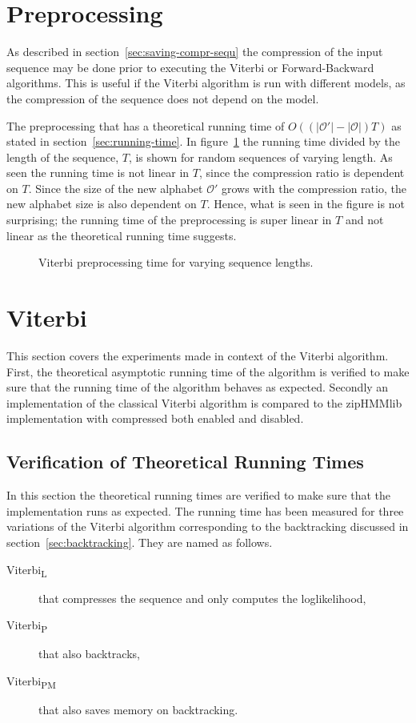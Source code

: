 \section{Preprocessing}

As described in section~\ref{sec:saving-compr-sequ} the compression of the
input sequence may be done prior to executing the Viterbi or Forward-Backward
algorithms. This is useful if the Viterbi algorithm is run with different
models, as the compression of the sequence does not depend on the model.

The preprocessing that has a theoretical running time of
$O( \left( \lvert\mathcal{O'}\rvert - \lvert{\mathcal{O}}\rvert \right) T)$ as
stated in section~\ref{sec:running-time}. In figure~\ref{fig:pre_viterbi_T} the
running time divided by the length of the sequence, $T$, is shown for random
sequences of varying length. As seen the running time is not linear in $T$,
since the compression ratio is dependent on $T$. Since the size of the new
alphabet $\mathcal{O'}$ grows with the compression ratio, the new alphabet size
is also dependent on $T$. Hence, what is seen in the figure is not surprising;
the running time of the preprocessing is super linear in $T$ and not linear as
the theoretical running time suggests.

\begin{figure}
  \centering
  
  \caption{Viterbi preprocessing time for varying sequence lengths.}
  \label{fig:pre_viterbi_T}
\end{figure}

\section{Viterbi}

This section covers the experiments made in context of the Viterbi
algorithm. First, the theoretical asymptotic running time of the algorithm is
verified to make sure that the running time of the algorithm behaves as
expected. Secondly an implementation of the classical Viterbi algorithm is
compared to the zipHMMlib implementation with compressed both enabled and
disabled.

\subsection{Verification of Theoretical Running Times}
\label{sec:theor-runn-times}

In this section the theoretical running times are verified to make sure that
the implementation runs as expected. The running time has been measured for
three variations of the Viterbi algorithm corresponding to the backtracking
discussed in section~\ref{sec:backtracking}. They are named as follows.
\begin{description}
\item[Viterbi\textsubscript{L}] that compresses the sequence and only computes the
  loglikelihood,
\item[Viterbi\textsubscript{P}] that also backtracks,
\item[Viterbi\textsubscript{PM}] that also saves memory on backtracking.
\end{description}


